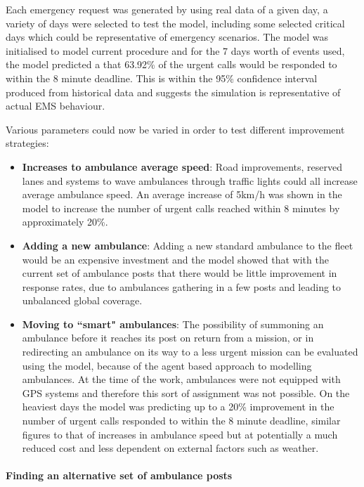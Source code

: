 \documentclass[11pt]{article} %
\begin{document}
Each emergency request was generated by using real data of a given day, a variety of days were selected to test the model, including some selected critical days which could be representative of emergency scenarios. The model was initialised to model current procedure and for the 7 days worth of events used, the model predicted a that 63.92\% of the urgent calls would be responded to within the 8 minute deadline. This is within the 95\% confidence interval produced from historical data and suggests the simulation is representative of actual EMS behaviour. 

Various parameters could now be varied in order to test different improvement strategies:
\begin{itemize}
	\item \textbf{Increases to  ambulance average speed}: Road improvements, reserved lanes and systems to wave ambulances through traffic lights could all increase average ambulance speed. An average increase of 5km/h was shown in the model to increase the number of urgent calls reached within 8 minutes by approximately 20\%.
	\item \textbf{Adding a new ambulance}:  Adding a new standard ambulance to the fleet would be an expensive investment and the model showed that with the current set of ambulance posts that there would be little improvement in response rates, due to ambulances gathering in a few posts and leading to unbalanced global coverage. 
	\item \textbf{Moving to ``smart" ambulances}: The possibility of summoning an ambulance before it reaches its post on return from a mission, or in redirecting an ambulance on its way to a less urgent mission can be evaluated using the model, because of the agent based approach to modelling ambulances. At the time of the work, ambulances were not equipped with GPS systems and therefore this sort of assignment was not possible. On the heaviest days the model was predicting up to a 20\% improvement in the number of urgent calls responded to within the 8 minute deadline, similar figures to that of increases in ambulance speed but at potentially a much reduced cost and less dependent on external factors such as weather. 
\end{itemize}

\paragraph{Finding an alternative set of ambulance posts}
\end{document}
